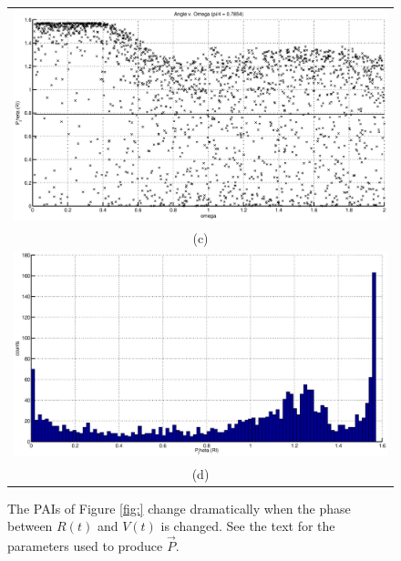 \documentclass[a4paper,11pt]{article}
\begin{document}
\begin{figure}
\begin{tabular}{c}
\includegraphics[scale=0.45]{Figure5_altB.eps}\\
(c) \\[6pt]
\includegraphics[scale=0.45]{Figure5_histB.eps}\\
(d) \\[6pt]
\end{tabular}
\caption{The PAIs of Figure \ref{fig:} change dramatically when the phase between $R(t)$ and $V(t)$ is changed.  See the text for the parameters used to produce $\vec{P}$.}
\end{figure}
\end{document}

